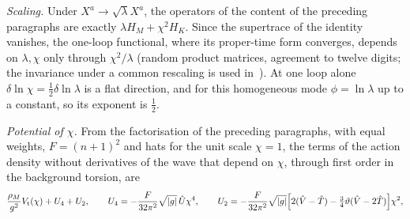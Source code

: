 \emph{Scaling.} Under \(X^a\to\sqrt\lambda X^a\), the operators of the content of the preceding paragraphs are exactly \(\lambda H_M+\chi^2H_K\). Since the supertrace of the identity vanishes, the one-loop functional, where its proper-time form converges, depends on \(\lambda,\chi\) only through \(\chi^2/\lambda\) (random product matrices, agreement to twelve digits; the invariance under a common rescaling is used in~\cite{MantaSteinacker2025b}). At one loop alone \(\delta\ln\chi=\tfrac12\delta\ln\lambda\) is a flat direction, and for this homogeneous mode \(\phi=\ln\lambda\) up to a constant, so its exponent is \(\tfrac12\).

\emph{Potential of \(\chi\).} From the factorisation of the preceding paragraphs, with equal weights, \(F=(n+1)^2\) and hats for the unit scale \(\chi=1\), the terms of the action density without derivatives of the wave that depend on \(\chi\), through first order in the background torsion, are
\[
\frac{\rho_M}{g^2}V_{\mathrm t}(\chi)+U_4+U_2,\qquad
U_4=-\frac{F}{32\pi^2}\sqrt{|g|}\,\hat U\chi^4,\qquad
U_2=-\frac{F}{32\pi^2}\sqrt{|g|}\Bigl[2(\hat V-\hat T)-\tfrac34\vartheta(\hat V-2\hat T)\Bigr]\chi^2,
\]
